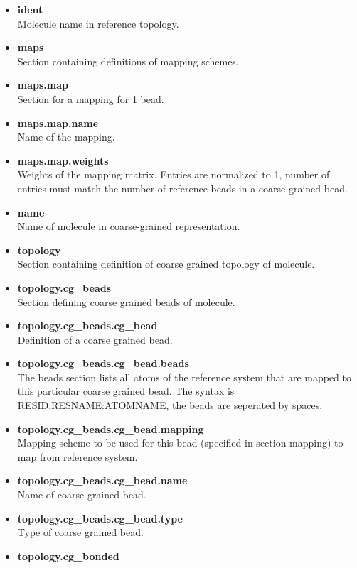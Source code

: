 
\begin{itemize}
\item \textbf{ident} \\
      Molecule name in reference topology.
\item \textbf{maps} \\
      Section containing definitions of mapping schemes.
\item \textbf{maps.map} \\
      Section for a mapping for 1 bead.
\item \textbf{maps.map.name} \\
      Name of the mapping.
\item \textbf{maps.map.weights} \\
      Weights of the mapping matrix. Entries are normalized to 1, number of entries must match the number of reference beads in a coarse-grained bead.
\item \textbf{name} \\
      Name of molecule in coarse-grained representation.
\item \textbf{topology} \\
      Section containing definition of coarse grained topology of molecule.
\item \textbf{topology.cg\_beads} \\
      Section defining coarse grained beads of molecule.
\item \textbf{topology.cg\_beads.cg\_bead} \\
      Definition of a coarse grained bead.
\item \textbf{topology.cg\_beads.cg\_bead.beads} \\
      The beads section lists all atoms of the reference system that are mapped to this particular
      coarse grained bead. The syntax is RESID:RESNAME:ATOMNAME, the beads are seperated by spaces.
\item \textbf{topology.cg\_beads.cg\_bead.mapping} \\
      Mapping scheme to be used for this bead (specified in section mapping) to map from reference system.
\item \textbf{topology.cg\_beads.cg\_bead.name} \\
      Name of coarse grained bead.
\item \textbf{topology.cg\_beads.cg\_bead.type} \\
      Type of coarse grained bead.
\item \textbf{topology.cg\_bonded} \\

\end{itemize}

